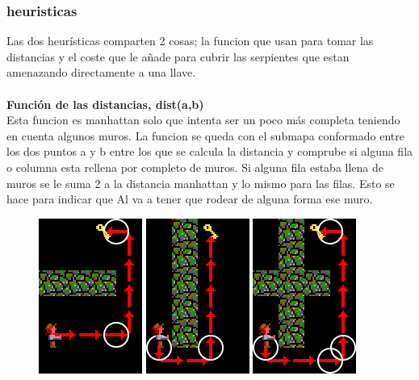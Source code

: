 \documentclass[11pt,spanish]{article}
\begin{document}
		\subsubsection{heuristicas}
		Las dos heurísticas comparten 2 cosas; la funcion que usan para tomar las distancias y el coste que le añade para cubrir las serpientes que estan amenazando directamente a una llave.\\
			\\
			\textbf{Función de las distancias, dist(a,b)}\\
			Esta funcion es manhattan solo que intenta ser un poco más completa teniendo en cuenta algunos muros. La funcion se queda con el submapa conformado entre los dos puntos a y b entre los que se calcula la distancia y comprube si alguna fila o columna esta rellena por completo de muros. Si alguna fila estaba llena de muros se le suma 2 a la distancia manhattan y lo mismo para las filas. Esto se hace para indicar que Al va a tener que rodear de alguna forma ese muro.
			\begin{figure}[h!]
				\centering
				\includegraphics[width=0.2\linewidth]{Horizontal.png}
				\includegraphics[width=0.2\linewidth]{Vertical.png}
				\includegraphics[width=0.2\linewidth]{HorizontalVertical.png}
			\end{figure}
\end{document}
